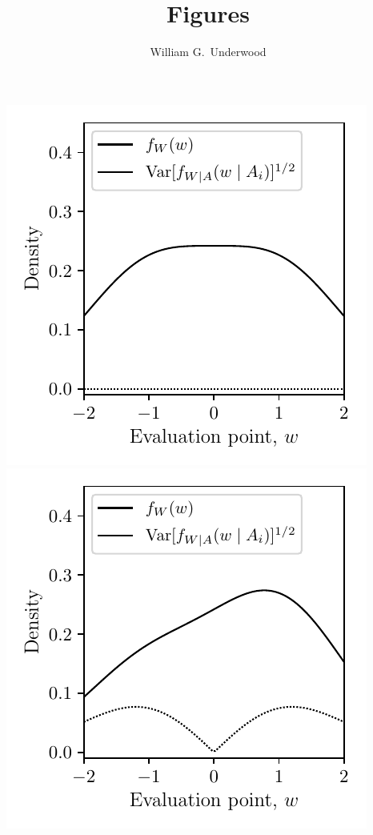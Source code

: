 \documentclass{article}
\title{Figures}
\author{William G.\ Underwood}
\begin{document}
\maketitle




\includegraphics[scale=0.5]{graphics/distribution_plot_total.pdf}
\includegraphics[scale=0.5]{graphics/distribution_plot_partial.pdf}
\end{document}
